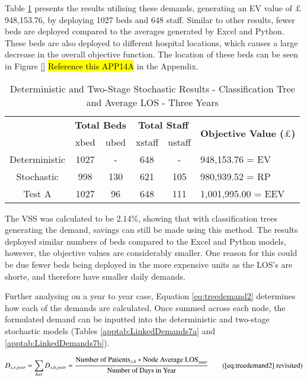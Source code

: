 \documentclass[../thesis.tex]{subfiles}
\begin{document}
Table \ref{tab:Results6} presents the results utilising these demands, generating an EV value of $\pounds$ 948,153.76, by deploying 1027 beds and 648 staff. Similar to other results, fewer beds are deployed compared to the averages generated by Excel and Python. These beds are also deployed to different hospital locations, which causes a large decrease in the overall objective function. The location of these beds can be seen in Figure \ref{} \hl{Reference this APP14A} in the Appendix.


\begin{table}[h!]
    \centering
    \begin{tabular}{cccccl}\toprule
 & \multicolumn{2}{l}{\textbf{Total Beds}} & \multicolumn{2}{c}{\textbf{Total Staff}} & \multirow{2}{*}{\textbf{Objective Value ($\pounds$)}}\\ \cmidrule(lr){2-3} \cmidrule(lr){4-5}
 & xbed           & ubed          & xstaff         & ustaff         \\ \midrule
    Deterministic      & 1027 & - & 648 & - & 948,153.76 = EV \\ \midrule
    Stochastic &998& 130& 621 & 105&  980,939.52 = RP \\ \midrule
    Test A & 1027 & 96 & 648 & 111 & 1,001,995.00 = EEV \\\bottomrule
    \end{tabular}
    \caption{Deterministic and Two-Stage Stochastic Results - Classification Tree and Average LOS - Three Years}
    \label{tab:Results6}
\end{table}

The VSS was calculated to be 2.14\%, showing that with classification trees generating the demand, savings can still be made using this method. The results deployed similar numbers of beds compared to the Excel and Python models, however, the objective values are considerably smaller. One reason for this could be due fewer beds being deployed in the more expensive units as the LOS's are shorte, and therefore have smaller daily demands.

Further analysing on a year to year case, Equation \eqref{eq:treedemand2} determines how each of the demands are calculated. Once summed across each node, the formulated demand can be inputted into the deterministic and two-stage stochastic models (Tables \ref{apptab:LinkedDemands7a} and \ref{apptab:LinkedDemands7b}).

\begin{equation}
        D_{s,r,year} = \sum\limits_{h \in r} D_{s,h,year} = \frac{\text{Number of Patients}_{s,h}* {\text{Node Average LOS}}_{year}}{\text{Number of Days in Year}} \tag{\ref{eq:treedemand2} revisited}
\end{equation}
\end{document}
